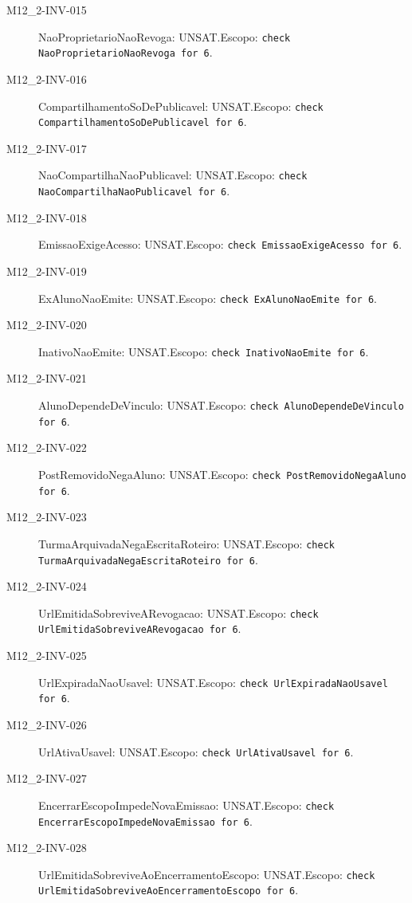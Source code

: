 \begin{description}
\item[M12\_2-INV-015] NaoProprietarioNaoRevoga: UNSAT.\newline Escopo: \texttt{check NaoProprietarioNaoRevoga for 6}.
\item[M12\_2-INV-016] CompartilhamentoSoDePublicavel: UNSAT.\newline Escopo: \texttt{check CompartilhamentoSoDePublicavel for 6}.
\item[M12\_2-INV-017] NaoCompartilhaNaoPublicavel: UNSAT.\newline Escopo: \texttt{check NaoCompartilhaNaoPublicavel for 6}.
\item[M12\_2-INV-018] EmissaoExigeAcesso: UNSAT.\newline Escopo: \texttt{check EmissaoExigeAcesso for 6}.
\item[M12\_2-INV-019] ExAlunoNaoEmite: UNSAT.\newline Escopo: \texttt{check ExAlunoNaoEmite for 6}.
\item[M12\_2-INV-020] InativoNaoEmite: UNSAT.\newline Escopo: \texttt{check InativoNaoEmite for 6}.
\item[M12\_2-INV-021] AlunoDependeDeVinculo: UNSAT.\newline Escopo: \texttt{check AlunoDependeDeVinculo for 6}.
\item[M12\_2-INV-022] PostRemovidoNegaAluno: UNSAT.\newline Escopo: \texttt{check PostRemovidoNegaAluno for 6}.
\item[M12\_2-INV-023] TurmaArquivadaNegaEscritaRoteiro: UNSAT.\newline Escopo: \texttt{check TurmaArquivadaNegaEscritaRoteiro for 6}.
\item[M12\_2-INV-024] UrlEmitidaSobreviveARevogacao: UNSAT.\newline Escopo: \texttt{check UrlEmitidaSobreviveARevogacao for 6}.
\item[M12\_2-INV-025] UrlExpiradaNaoUsavel: UNSAT.\newline Escopo: \texttt{check UrlExpiradaNaoUsavel for 6}.
\item[M12\_2-INV-026] UrlAtivaUsavel: UNSAT.\newline Escopo: \texttt{check UrlAtivaUsavel for 6}.
\item[M12\_2-INV-027] EncerrarEscopoImpedeNovaEmissao: UNSAT.\newline Escopo: \texttt{check EncerrarEscopoImpedeNovaEmissao for 6}.
\item[M12\_2-INV-028] UrlEmitidaSobreviveAoEncerramentoEscopo: UNSAT.\newline Escopo: \texttt{check UrlEmitidaSobreviveAoEncerramentoEscopo for 6}.

\end{description}
